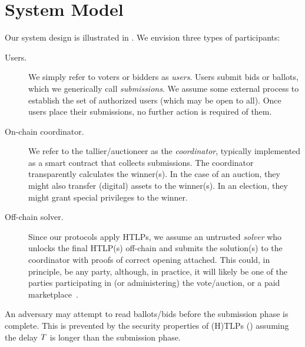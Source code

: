 \section{System Model}\label{sec:cicada_model}



Our system design is illustrated in . We envision three types of participants:
\begin{description}
    \item[Users.] We simply refer to voters or bidders as \emph{users}. Users submit bids or ballots, which we generically call \emph{submissions}. We assume some external process to establish the set of authorized users (which may be open to all).  Once users place their submissions, no further action is required of them. 
    \item[On-chain coordinator.] We refer to the tallier/auctioneer as the \emph{coordinator}, typically implemented as a smart contract that collects submissions. The coordinator transparently calculates the winner(s). In the case of an auction, they might also transfer (digital) assets to the winner(s). In an election, they might grant special privileges to the winner.%
    \item[Off-chain solver.] Since our protocols apply HTLPs, we assume an untrusted \emph{solver} who unlocks the final HTLP(s) off-chain and submits the solution(s) to the coordinator with proofs of correct opening attached. This could, in principle, be any party, although, in practice, it will likely be one of the parties participating in (or administering) the vote/auction, or a paid marketplace~\cite{EPRINT:Abadi23,CCS:TGBKS21}.
\end{description}

An adversary may attempt to read ballots/bids before the submission phase is complete. This is prevented by the security properties of (H)TLPs () assuming the delay $T$ is longer than the submission phase.